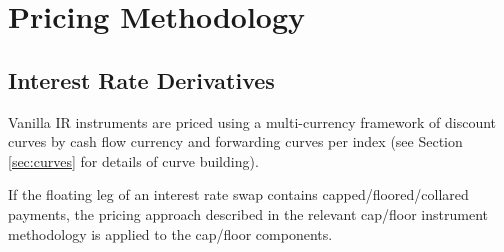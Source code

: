 \documentclass[12pt, a4paper]{article}
\begin{document}
%








































\section{Pricing Methodology}
\label{sec:pricingmethods}


\subsection{Interest Rate Derivatives}
Vanilla IR instruments are priced using a multi-currency framework of discount 
curves by cash flow currency and forwarding curves per index (see Section 
\ref{sec:curves} for details of curve building). 

If the floating leg of an interest rate swap contains capped/floored/collared 
payments, the pricing approach described in the relevant cap/floor instrument 
methodology is applied to the cap/floor components.
\end{document}
